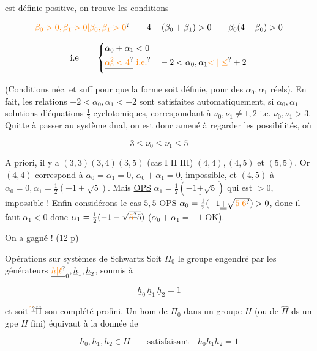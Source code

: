 est définie positive, on trouve les conditions

\[
 \deleted{\unsure{\beta_0>0,\beta_1>0|\beta_0,\beta_1>0}}\qquad
 4-(\beta_0+\beta_1)>0\qquad\beta_0(4-\beta_0)>0
\]

\[
 \text{i.e}\qquad\left\{\begin{aligned}
 &\alpha_0+\alpha_1<0\\
 &\deleted{\unsure{\alpha_0^2<4}}\ \text{\unsure{i.e.}}\quad -2<\alpha_0,\alpha_1\unsure{<|\leq}+2
 \end{aligned}\right.
\]

(Conditions néc. et suff pour que la forme  soit définie, pour des  $\alpha_0,\alpha_1$ réels).
En fait, les relations $-2<\alpha_0,\alpha_1<+2$ sont satisfaites automatiquement, si $\alpha_0,\alpha_1$ solutions d'équations $\tfrac12$ cyclotomiques, correspondant à $\nu_0,\nu_1\ne1,2$ i.e. $\nu_0,\nu_1>3$. Quitte à passer au système dual, on est donc amené à regarder les possibilités, où

\[
 3\leq\nu_0\leq\nu_1\leq5
\]

A priori, il y a  $(3,3)(3,4)(3,5)$ (cas I II III) $(4,4),(4,5)$ et $(5,5)$. Or $(4,4)$ correspond à  $\alpha_0=\alpha_1=0$, $\alpha_0+\alpha_1=0$, impossible, et $(4,5)$ à $\alpha_0=0,\alpha_1=\tfrac12(-1\pm\sqrt5)$. Mais \uline{OPS} $\alpha_1=\tfrac12(-1\underline{\underline{+}}\sqrt5)$ qui est $>0$,  impossible ! Enfin considérons le cas $5,5$ OPS $\alpha_0=\tfrac12(-1\underline{\underline{+}}\sqrt{\unsure{5|6}})>0$, donc il faut $\alpha_1<0$ donc $\alpha_{1}=\tfrac12(-1-\sqrt{\deleted{\unsure{5}}5})$ ($\alpha_0+\alpha_1=-1$ OK).

On a gagné !
(12 p)

Opérations sur systèmes de Schwartz
Soit $\Pi_0$ le groupe engendré par les générateurs $\underline{\unsure{h|\ell}}_0,\underline h_1,\underline h_2$, soumis à

\[
 \underline h_0\,\underline h_1\,\underline h_2=1
\]

et soit $\deleted{\unsure{\widehat{\vphantom\Pi}}}\widehat\Pi$ son complété profini. Un hom de $\Pi_0$ dans un groupe $H$ (ou de $\widehat\Pi$ ds un gpe $H$ fini) équivaut à la donnée de

\[
 h_0,h_1,h_2\in H\qquad\text{satisfaisant}\quad h_0h_1h_2=1
\]

